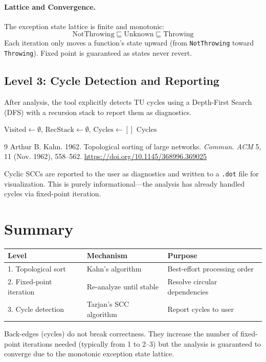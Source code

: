 \documentclass[11pt]{article}
\begin{document}
\paragraph{Lattice and Convergence.} The exception state lattice is finite and monotonic:
\[
\text{NotThrowing} \sqsubseteq \text{Unknown} \sqsubseteq \text{Throwing}
\]
Each iteration only moves a function's state upward (from \texttt{NotThrowing} toward \texttt{Throwing}). Fixed point is guaranteed as states never revert.

\subsection{Level 3: Cycle Detection and Reporting}

After analysis, the tool explicitly detects TU cycles using a Depth-First Search (DFS) with a recursion stack to report them as diagnostics.

\begin{algorithm}[H]
\caption{TU Cycle Detection (DFS)}
\begin{algorithmic}[1]
    \State $\text{Visited} \gets \emptyset$, $\text{RecStack} \gets \emptyset$, $\text{Cycles} \gets []$
        \State {}
    \EndFor
    \State \Return $\text{Cycles}$
\EndProcedure
\end{algorithmic}
\end{algorithm}

\begin{thebibliography}{9}
Arthur B. Kahn. 1962. Topological sorting of large networks. \textit{Commun. ACM} 5, 11 (Nov. 1962), 558–562. \url{https://doi.org/10.1145/368996.369025}
\end{thebibliography}

Cyclic SCCs are reported to the user as diagnostics and written to a \texttt{.dot} file for visualization. This is purely informational---the analysis has already handled cycles via fixed-point iteration.

\section{Summary}

\begin{center}
\begin{tabular}{lll}
\hline
\textbf{Level} & \textbf{Mechanism} & \textbf{Purpose} \\
\hline
1. Topological sort & Kahn's algorithm & Best-effort processing order \\
2. Fixed-point iteration & Re-analyze until stable & Resolve circular dependencies \\
3. Cycle detection & Tarjan's SCC algorithm & Report cycles to user \\
\hline
\end{tabular}
\end{center}

Back-edges (cycles) do not break correctness. They increase the number of fixed-point iterations needed (typically from 1 to 2--3) but the analysis is guaranteed to converge due to the monotonic exception state lattice.
\end{document}
